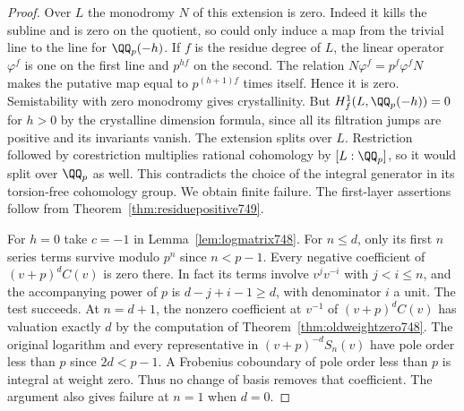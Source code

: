 \documentclass[a4paper,11pt]{article}
\theoremstyle{definition}
\theoremstyle{remark}
\numberwithin{equation}{section}
\begin{document}
\begin{proof}
Over \(L\) the monodromy \(N\) of this extension is zero.
Indeed it kills the subline and is zero on the quotient,
so could only induce a map from the trivial line to the
line for \(\QQ_p(-h)\). If \(f\) is the residue degree of
\(L\), the linear operator \(\varphi^f\) is one on the first
line and \(p^{hf}\) on the second. The relation
\(N\varphi^f=p^f\varphi^f N\) makes the putative map equal
to \(p^{(h+1)f}\) times itself. Hence it is zero. Semistability
with zero monodromy gives crystallinity. But
\(H^1_f(L,\QQ_p(-h))=0\) for \(h>0\) by the crystalline
dimension formula, since all its filtration jumps are positive
and its invariants vanish. The extension splits over \(L\).
Restriction followed by corestriction multiplies rational
cohomology by \([L:\QQ_p]\), so it would split over \(\QQ_p\)
as well. This contradicts the choice of the integral generator
in its torsion-free cohomology group. We obtain finite failure.
The first-layer assertions follow from Theorem~\ref{thm:residuepositive749}.

For \(h=0\) take \(c=-1\) in Lemma~\ref{lem:logmatrix748}.
For \(n\le d\), only its first \(n\) series terms survive
modulo \(p^n\) since \(n<p-1\). Every negative coefficient of
\((v+p)^d C(v)\) is zero there. In fact its terms involve
\(v^j v^{-i}\) with \(j<i\le n\), and the accompanying power
of \(p\) is \(d-j+i-1\ge d\), with denominator \(i\) a unit.
The test succeeds. At \(n=d+1\), the nonzero coefficient at
\(v^{-1}\) of \((v+p)^d C(v)\) has valuation exactly \(d\)
by the computation of Theorem~\ref{thm:oldweightzero748}.
The original logarithm and every representative in
\((v+p)^{-d}S_n(v)\) have pole order less than \(p\) since
\(2d<p-1\). A Frobenius coboundary of pole order less than
\(p\) is integral at weight zero. Thus no change of basis
removes that coefficient. The argument also gives failure at
\(n=1\) when \(d=0\).
\end{proof}
\end{document}
